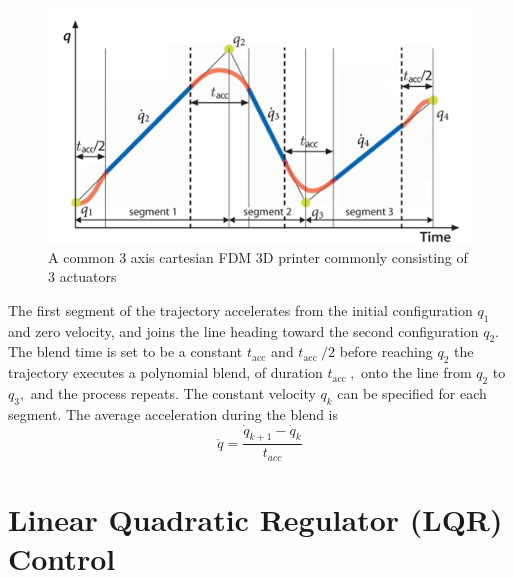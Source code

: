 \documentclass{UoNMCHA}
\numberwithin{equation}{section}
\begin{document}
\begin{figure}[H]
	\begin{center}
		\includegraphics[width=.5\linewidth]{figs/Picture11}
		\caption{A  common 3 axis cartesian FDM 3D printer commonly consisting of 3 actuators}
		\label{figs/Picture11}
	\end{center}
\end{figure}

The first segment of the trajectory accelerates from the initial configuration $q_{1}$ and zero velocity, and
joins the line heading toward the second configuration $q_{2}$. The blend time is set to be a constant $t_{\mathrm{acc}}$
and $t_{\text {acc }} / 2$ before reaching $q_{2}$ the trajectory executes a polynomial blend, of duration $t_{\text {acc }},$ onto the line
from $q_{2}$ to $q_{3},$ and the process repeats. The constant velocity $q_{k}$ can be specified for each segment. The
average acceleration during the blend is
$$
\ddot{q}=\frac{\dot{q}_{k+1}-\dot{q}_{k}}{t_{a c c}}
$$

\section{Linear Quadratic Regulator (LQR) Control}
\end{document}
